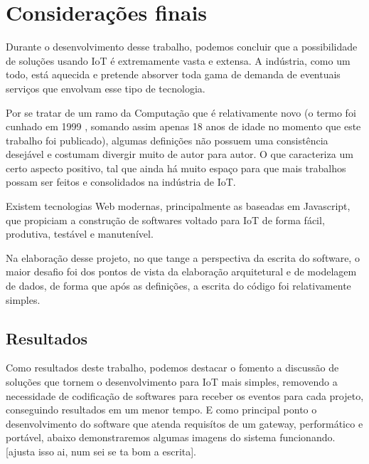 \section*{Considerações finais}

Durante o desenvolvimento desse trabalho, podemos concluir que a possibilidade de soluções usando IoT é extremamente vasta e extensa. A indústria, como um todo, está aquecida e pretende absorver toda gama de demanda de eventuais serviços que envolvam esse tipo de tecnologia.

Por se tratar de um ramo da Computação que é relativamente novo (o termo foi cunhado em 1999 \cite{Kevin}, somando assim apenas 18 anos de idade no momento que este trabalho foi publicado), algumas definições não possuem uma consistência desejável e costumam divergir muito de autor para autor. O que caracteriza um certo aspecto positivo, tal que ainda há muito espaço para que mais trabalhos possam ser feitos e consolidados na indústria de IoT.

Existem tecnologias Web modernas, principalmente as baseadas em Javascript, que propiciam a construção de softwares voltado para IoT de forma fácil, produtiva, testável e manutenível.

Na elaboração desse projeto, no que tange a perspectiva da escrita do software, o maior desafio foi dos pontos de vista da elaboração arquitetural e de modelagem de dados, de forma que após as definições, a escrita do código foi relativamente simples.

\subsection{Resultados}
\label{resultados}

Como resultados deste trabalho, podemos destacar o fomento a discussão de soluções que tornem o desenvolvimento para IoT mais simples, removendo a necessidade de codificação de softwares para receber os eventos para cada projeto, conseguindo resultados em um menor tempo. E como principal ponto o desenvolvimento do software que atenda requisítos de um gateway, performático e portável, abaixo demonstraremos algumas imagens do sistema funcionando. [ajusta isso ai, num sei se ta bom a escrita].

